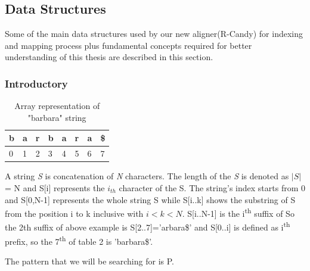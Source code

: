 \documentclass[11pt,a4paper]{report}
\begin{document}



\subsection{Data Structures}

Some of the main data structures used by our new aligner(R-Candy) for indexing and mapping process plus fundamental concepts required for better understanding of this thesis are described in this section. 

\subsubsection{Introductory}

\begin{table}[h]
 \centering
  \begin{tabular}{ | p{0.5cm} | p{0.5cm} | p{0.5cm} |p{0.5cm} |p{0.5cm} |p{0.5cm} |p{0.5cm} |p{0.5cm} |}
    \hline
  \textbf{b} & \textbf{a } &\textbf{r}  &\textbf{b} &\textbf{a} &\textbf{r} &\textbf{a} &\textbf{\$}\\ \hline
       0 & 1 &2&3&4&5&6&7 \\ \hline
      
   \end{tabular}
\caption{Array representation of "barbara" string}
\label{Array-representation}
\end{table}




A string \emph{S} is concatenation of \emph{N} characters. 
The length of the \emph{S} is denoted as $\lvert S \rvert$ = N and S[i] represents the $i_{th}$ character of the S.
The string's index starts from 0 and S[0,N-1] represents the whole string S while S[i..k] shows the substring of S from the position i to k inclusive with $i < k < N$. 
S[i..N-1] is the i\textsuperscript{th} suffix of So the 2th suffix of above example is S[2..7]='arbara\$' and
 S[0..i] is defined as i\textsuperscript{th} prefix, so the 7\textsuperscript{th} of table 2 is 'barbara\$'.
 
The pattern that we will be searching for is P.
\end{document}
